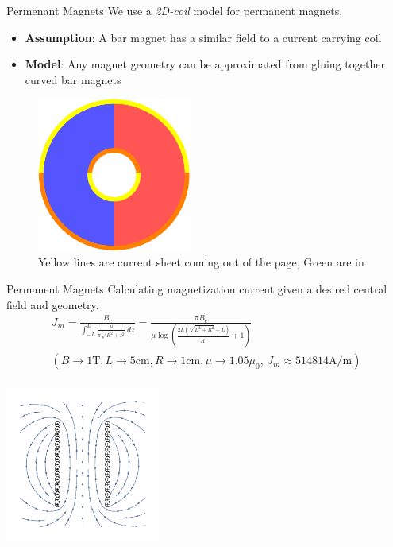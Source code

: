 \documentclass{beamer}
\begin{document}
    \begin{frame}{Permenant Magnets}
        We use a \textit{2D-coil} model for permanent magnets.
        \begin{itemize}
            \item \textbf{Assumption}: A bar magnet has a similar field to a current carrying coil
            \item \textbf{Model}: Any magnet geometry can be approximated from gluing together curved bar magnets
        \end{itemize}
        \begin{figure}
            \center
            \includegraphics[width=2in]{current_magnet.pdf}
            \caption*{Yellow lines are current sheet coming out of the page, Green are in}
        \end{figure}
    \end{frame}
    \begin{frame}{Permanent Magnets}
        Calculating magnetization current given a desired central field and geometry.
        \begin{gather*}
            J_m=\frac{B_c}{\int_{-L}^L \frac{\mu }{\pi  \sqrt{R^2+z^2}} \, dz}=\frac{\pi  B_c}{\mu  \log \left(\frac{2 L \left(\sqrt{L^2+R^2}+L\right)}{R^2}+1\right)}\\
            (B\to 1\text{T},L\to 5\text{cm},R\to 1\text{cm},\mu \to 1.05 \mu _0,\,J_m\approx 514814\text{A}/\text{m})\\
        \end{gather*}
        \begin{center}
            \vspace{-.5cm}
            \includegraphics[width=2in]{magnet_model.pdf}
        \end{center}
    \end{frame}
\end{document}
